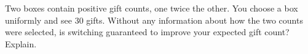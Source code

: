 Two boxes contain positive gift counts, one twice the other. You choose a box uniformly and see 30 gifts. Without any information about how the two counts were selected, is switching guaranteed to improve your expected gift count? Explain.
